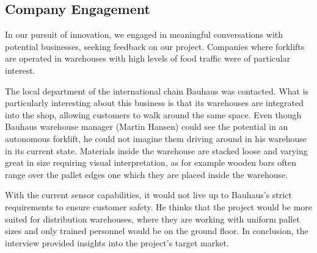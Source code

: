 \documentclass[../report.tex]{subfiles}
\begin{document}
\subsection{Company Engagement}
In our pursuit of innovation, we engaged in meaningful conversations with
potential businesses, seeking feedback on our project. Companies where
forklifts are operated in warehouses with high levels of food traffic were of
particular interest.

The local department of the international chain Bauhaus was contacted. What is
particularly interesting about this business is that its warehouses are
integrated into the shop, allowing customers to walk around the same space.
Even though Bauhaus warehouse manager (Martin Hansen) could see the potential in
an autonomous forklift, he could not imagine them driving around in his
warehouse in its current state. Materials inside the warehouse are stacked loose and 
varying great in size requiring visual interpretation, as for example wooden bars often
range over the pallet edges one which they are placed inside the warehouse.

With the current sensor capabilities, it
would not live up to Bauhaus's strict requirements to ensure customer safety. He
thinks that the project would be more suited for distribution warehouses, where they 
are working with uniform pallet sizes and only trained personnel would be on 
the ground floor. In conclusion, the
interview provided insights into the project's target market.
\end{document}
